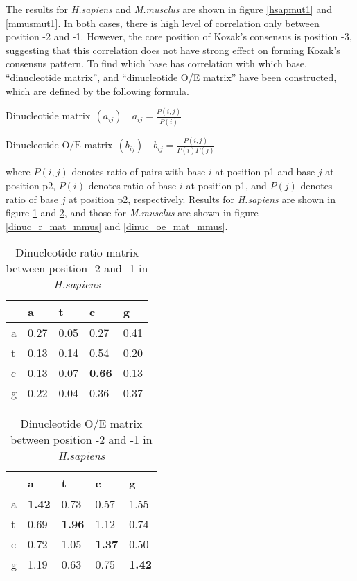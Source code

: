 The results for {\it H.sapiens} and {\it M.musclus} are shown in figure
\ref{hsapmut1} and \ref{mmusmut1}.  In both cases, there is high level
of correlation only between position -2 and -1. However, the core
position of Kozak's consensus is position -3, suggesting that this
correlation does not have strong effect on forming Kozak's
consensus pattern. To find which base has correlation with which base,
``dinucleotide matrix'', and ``dinucleotide O/E matrix'' have been
constructed, which are defined by the following formula.

\vspace{1em}

\begin{math}
\mbox{Dinucleotide matrix}\:\:(a_{ij}) \quad
a_{ij} = \frac{P(i,j)}{P(i)}
\end{math}

\begin{math}
\mbox{Dinucleotide O/E matrix}\:\:(b_{ij}) \quad
b_{ij} = \frac{P(i,j)}{P(i)P(j)}
\end{math}

\vspace{1em}

\noindent
where \(P(i,j)\) denotes ratio of pairs with base \(i\) at position
p1 and base \(j\) at position p2, \(P(i)\) denotes ratio of base
\(i\) at position p1, and \(P(j)\) denotes ratio of base \(j\) at
position p2, respectively. Results for {\it H.sapiens} are shown in
figure \ref{dinuc_r_mat_hsap} and \ref{dinuc_oe_mat_hsap}, and those
for {\it M.musclus} are shown in figure \ref{dinuc_r_mat_mmus} and
\ref{dinuc_oe_mat_mmus}.


\begin{table}
\begin{center}
\begin{tabular}{l|llll}
  & a & t & c & g \\
\hline
a &0.27&0.05&0.27& 0.41\\ 
t &0.13&0.14&0.54& 0.20\\ 
c &0.13&0.07&{\bf 0.66}& 0.13\\
g &0.22&0.04&0.36& 0.37\\
\end{tabular} 
\end{center}
\caption{Dinucleotide ratio matrix between position -2 and -1 in {\it H.sapiens}}
\label{dinuc_r_mat_hsap}
\end{table}


\begin{table}
\begin{center}
\begin{tabular}{l|llll}
    & a  & t  & c  & g  \\
\hline
a & {\bf 1.42} & 0.73& 0.57& 1.55\\ 
t & 0.69 & {\bf 1.96} & 1.12& 0.74\\ 
c & 0.72 & 1.05& {\bf 1.37} & 0.50\\ 
g & 1.19 & 0.63& 0.75& {\bf 1.42}\\
\end{tabular}
\end{center}
\caption{Dinucleotide O/E matrix between position -2 and -1 in {\it H.sapiens}}
\label{dinuc_oe_mat_hsap}
\end{table}


